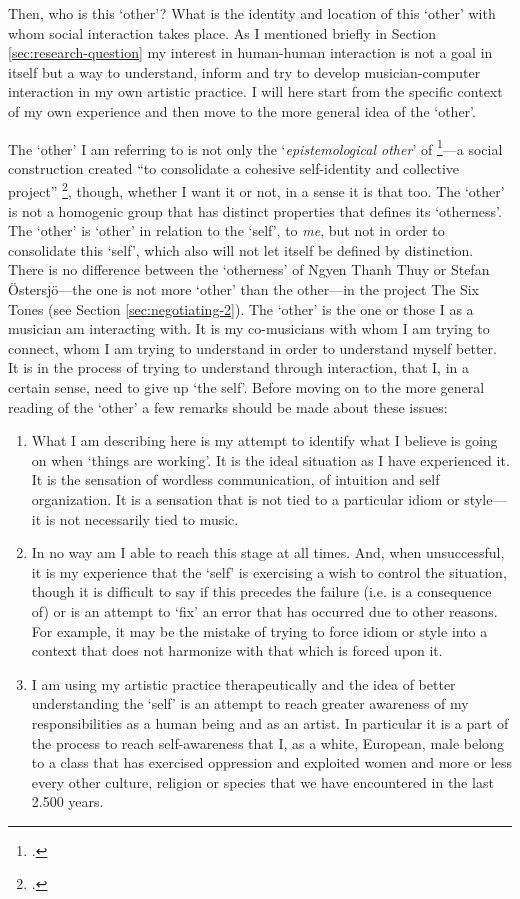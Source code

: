 Then, who is this `other'? What is the identity and location of this `other' with whom social interaction takes place. As I mentioned briefly in Section \ref{sec:research-question} my interest in human-human interaction is not a goal in itself but a way to understand, inform and try to develop musician-computer interaction in my own artistic practice. I will here start from the specific context of my own experience and then move to the more general idea of the `other'.

The `other' I am referring to is not only the `\emph{epistemological other}' of \footcite{somers94}---a social construction created ``to consolidate a cohesive self-identity and collective project'' \footcite[As cited in][]{lewis-1}, though, whether I want it or not, in a sense it is that too. The `other' is not a homogenic group that has distinct properties that defines its `otherness'. The `other' is `other' in relation to the `self', to \emph{me}, but not in order to consolidate this `self', which also will not let itself be defined by distinction.  There is no difference between the `otherness' of Ngyen Thanh Thuy or Stefan \"{O}stersj\"{o}---the one is not more `other' than the other---in the project The Six Tones (see Section \ref{sec:negotiating-2}). The `other' is the one or those I as a musician am interacting with. It is my co-musicians with whom I am trying to connect, whom I am trying to understand in order to understand myself better. It is in the process of trying to understand through interaction, that I, in a certain sense, need to give up `the self'. Before moving on to the more general reading of the `other' a few remarks should be made about these issues:
\begin{enumerate}
\item What I am describing here is my attempt to identify what I believe is going on when `things are working'. It is the ideal situation as I have experienced it. It is the sensation of wordless communication, of intuition and self organization. It is a sensation that is not tied to a particular idiom or style---it is not necessarily tied to music.
%
\item In no way am I able to reach this stage at all times. And, when unsuccessful, it is my experience that the `self' is exercising a wish to control the situation, though it is difficult to say if this precedes the failure (i.e. is a consequence of) or is an attempt to `fix' an error that has occurred due to other reasons. For example, it may be the mistake of trying to force idiom or style into a context that does not harmonize with that which is forced upon it.
%
\item I am using my artistic practice therapeutically and the idea of better understanding the `self' is an attempt to reach greater awareness of my responsibilities as a human being and as an artist. In particular it is a part of the process to reach self-awareness that I, as a white, European, male belong to a class that has exercised oppression and exploited women and more or less every other culture, religion or species that we have encountered in the last 2.500 years.
\end{enumerate}

